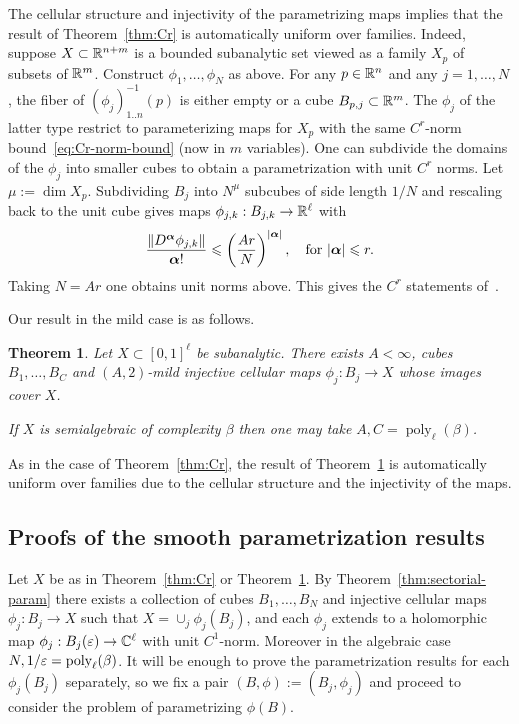 \documentclass[reqno]{amsart}
\newtheorem{Thm}{Theorem}{\bfseries}{\itshape}
\renewcommand\~[1]{\widetilde{#1}}
\def\poly{\operatorname{poly}} \def\J{\operatorname{J}}
\def\valpha{{\boldsymbol\alpha}}
\begin{document}
The cellular structure and injectivity of the parametrizing maps
implies that the result of Theorem~\ref{thm:Cr} is automatically
uniform over families. Indeed, suppose $X\subset{\mathbb R}^{n+m}$ is a bounded
subanalytic set viewed as a family $X_p$ of subsets of
${\mathbb R}^m$. Construct $\phi_1,\ldots,\phi_N$ as above. For any $p\in{\mathbb R}^n$
and any $j=1,\ldots,N$, the fiber of $(\phi_j)_{1..n}^{-1}(p)$ is
either empty or a cube $B_{p,j}\subset{\mathbb R}^m$. The $\phi_j$ of the
latter type restrict to parameterizing maps for $X_p$ with the same
$C^r$-norm bound~\eqref{eq:Cr-norm-bound} (now in $m$ variables). One
can subdivide the domains of the $\phi_j$ into smaller cubes to obtain
a parametrization with unit $C^r$ norms. Let
$\mu:=\dim X_p$. Subdividing $B_j$ into $N^\mu$ subcubes of side length
$1/N$ and rescaling back to the unit cube gives maps
$\phi_{j,k}:B_{j,k}\to{\mathbb R}^\ell$ with
\begin{equation}
  \frac{\norm{D^\valpha \phi_{j,k}}}{\valpha!} \le \left(\frac{A r}N\right)^{|\valpha|}, \quad
  \text{for } |\valpha|\le r.
\end{equation}
Taking $N=Ar$ one obtains unit norms above. This gives the $C^r$
statements of~.

Our result in the mild case is as follows.

\begin{Thm}\label{thm:mild}
  Let $X\subset[0,1]^\ell$ be subanalytic. There exists $A<\infty$,
  cubes $B_1,\ldots,B_C$ and $(A,2)$-mild injective cellular maps
  $\phi_j:B_j\to X$ whose images cover $X$.

  If $X$ is semialgebraic of complexity $\beta$ then one may take
  $A,C=\poly_\ell(\beta)$.
\end{Thm}

As in the case of Theorem~\ref{thm:Cr}, the result of
Theorem~\ref{thm:mild} is automatically uniform over families due to
the cellular structure and the injectivity of the maps.

\subsection{Proofs of the smooth parametrization results}
\label{sec:param-proofs}

Let $X$ be as in Theorem~\ref{thm:Cr} or Theorem~\ref{thm:mild}. By
Theorem~\ref{thm:sectorial-param} there exists a collection of cubes
$B_1,\ldots,B_N$ and injective cellular maps $\phi_j:B_j\to X$ such
that $X=\cup_j\phi_j(B_j)$, and each $\phi_j$ extends to a holomorphic
map $\phi_j:B_j(\varepsilon)\to{\mathbb C}^\ell$ with unit $C^1$-norm. Moreover in the
algebraic case $N,1/\e=\poly_\ell(\beta)$. It will be enough to prove
the parametrization results for each $\phi_j(B_j)$ separately, so we
fix a pair $(B,\phi):=(B_j,\phi_j)$ and proceed to consider the
problem of parametrizing $\phi(B)$.
\end{document}
